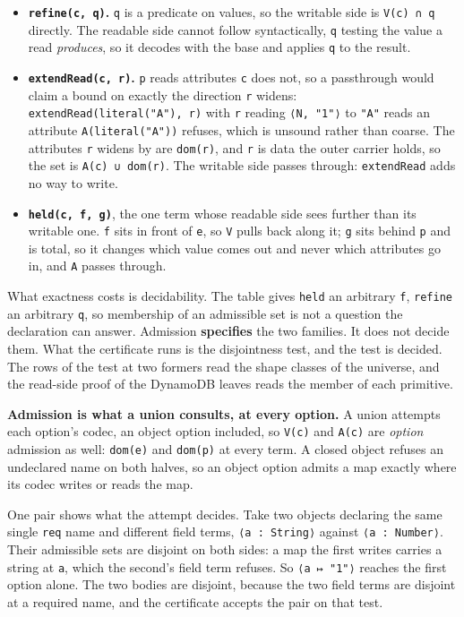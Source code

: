 \begin{itemize}
\tightlist
\item
  \textbf{\texttt{refine(c,\ q)}.} \texttt{q} is a predicate on values, so the writable side is \texttt{V(c)\ ∩\ q} directly. The
  readable side cannot follow syntactically, \texttt{q} testing the value a read \emph{produces}, so it decodes
  with the base and applies \texttt{q} to the result.
\item
  \textbf{\texttt{extendRead(c,\ r)}.} \texttt{p} reads attributes \texttt{c} does not, so a passthrough would claim a bound on
  exactly the direction \texttt{r} widens: \texttt{extendRead(literal("A"),\ r)} with \texttt{r} reading \texttt{⟨N,\ "1"⟩} to \texttt{"A"}
  reads an attribute \texttt{A(literal("A"))} refuses, which is unsound rather than coarse. The attributes
  \texttt{r} widens by are \texttt{dom(r)}, and \texttt{r} is data the outer carrier holds, so the set is \texttt{A(c)\ ∪\ dom(r)}. The
  writable side passes through: \texttt{extendRead} adds no way to write.
\item
  \textbf{\texttt{held(c,\ f,\ g)}}, the one term whose readable side sees further than its writable one. \texttt{f} sits
  in front of \texttt{e}, so \texttt{V} pulls back along it; \texttt{g} sits behind \texttt{p} and is total, so it changes which
  value comes out and never which attributes go in, and \texttt{A} passes through.
\end{itemize}

What exactness costs is decidability. The table gives \texttt{held} an
arbitrary \texttt{f}, \texttt{refine} an arbitrary \texttt{q}, so membership of an admissible set is not a question the
declaration can answer. Admission \textbf{specifies} the two families. It does not decide them. What the
certificate runs is the disjointness test, and the test is decided. The rows of the
test at two formers read the shape classes of the universe, and the read-side proof of the DynamoDB
leaves reads the member of each primitive.

\textbf{Admission is what a union consults, at every option.} A union attempts each option's codec, an
object option included, so \texttt{V(c)} and \texttt{A(c)} are \emph{option} admission as well: \texttt{dom(e)} and
\texttt{dom(p)} at every term. A closed object refuses an undeclared name on both halves, so an object option
admits a map exactly where its codec writes or reads the map.

One pair shows what the attempt decides. Take two objects declaring the same single \texttt{req} name and
different field terms, \texttt{⟨a\ :\ String⟩} against \texttt{⟨a\ :\ Number⟩}. Their admissible sets are disjoint on
both sides: a map the first writes carries a string at \texttt{a}, which the second's field term refuses. So
\texttt{⟨a\ ↦\ "1"⟩} reaches the first option alone. The two bodies are disjoint, because the two field terms are
disjoint at a required name, and the certificate accepts the pair on that test.


